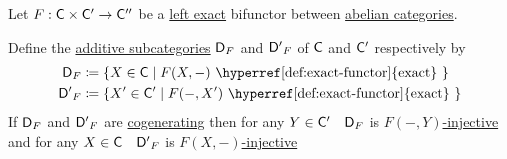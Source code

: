 \documentclass[../../main]{subfiles}
\begin{document}
\begin{theorem}
  Let \(F: \mathsf{C} \times \mathsf{C'} \to \mathsf{C''}\) be a \hyperref[def:exact-functor]{left exact} bifunctor between \hyperref[def:abelian-category]{abelian categories}.

  Define the \hyperref[def:additive-category]{additive subcategories} \(\mathsf{D}_{F}\) and \(\mathsf{D'}_{F}\) of \(\mathsf{C}\) and \(\mathsf{C}'\) respectively by
  \begin{align*}
    \category{D}_{F} &\coloneq \{X \in \category{C} \mid F(X, -) \text{ \hyperref[def:exact-functor]{exact} }\} \\
    \category{D'}_{F} &\coloneq \{X' \in \category{C'} \mid F(-, X') \text{ \hyperref[def:exact-functor]{exact} }\}
  \end{align*}
  If \(\mathsf{D}_{F}\) and \(\mathsf{D'}_{F}\) are \hyperref[def:cogenerating-category]{cogenerating} then for any \(Y \in \mathsf{C'} \quad \mathsf{D}_{F}\) is \hyperref[def:F-injective-bifunctor]{\(F(-, Y)\)-injective} and for any \(X \in \mathsf{C} \quad \mathsf{D'}_{F}\) is \hyperref[def:F-injective-bifunctor]{\(F(X, -)\)-injective}
\end{theorem}
\end{document}
